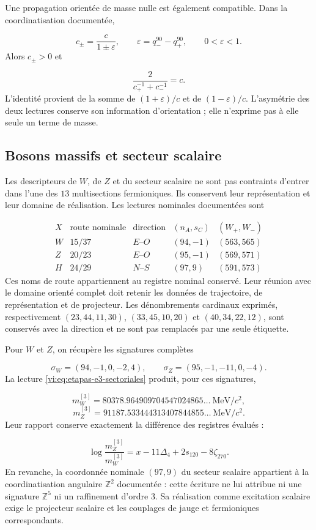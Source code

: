 Une propagation orientée de masse nulle est également compatible. Dans la
coordinatisation documentée,

\[
 c_\pm=\frac{c}{1\pm\varepsilon},\qquad
 \varepsilon=q_-^{90}-q_+^{90},\qquad0<\varepsilon<1.
\]
Alors \(c_\pm>0\) et

\[
 \frac{2}{c_+^{-1}+c_-^{-1}}=c.
\]
L’identité provient de la somme de \((1+\varepsilon)/c\) et de
\((1-\varepsilon)/c\). L’asymétrie des deux lectures conserve son
information d’orientation ; elle n’exprime pas à elle seule un terme de masse.


\subsection{Bosons massifs et secteur scalaire
}
\label{vi:subsec:bosones-familias}

Les descripteurs de \(W\), de \(Z\) et du secteur scalaire ne sont pas contraints
d’entrer dans l’une des \(13\) multisections fermioniques. Ils conservent leur
représentation et leur domaine de réalisation. Les lectures nominales
documentées sont

\[
\begin{array}{c|c|c|c|c}
 X&\text{route nominale}&\text{direction}&(n_A,s_C)&(W_+,W_-)\\\hline
 W&15/37&E\text{--}O&(94,-1)&(563,565)\\
 Z&20/23&E\text{--}O&(95,-1)&(569,571)\\
 H&24/29&N\text{--}S&(97,9)&(591,573)
\end{array}
\]
Ces noms de route appartiennent au registre nominal conservé. Leur
réunion avec le domaine orienté complet doit retenir les données de
trajectoire, de représentation et de projecteur. Les dénombrements cardinaux
exprimés, respectivement \((23,44,11,30)\), \((33,45,10,20)\) et
\((40,34,22,12)\), sont conservés avec la direction et ne sont pas remplacés
par une seule étiquette.


Pour \(W\) et \(Z\), on récupère les signatures complètes

\[
 \sigma_W=(94,-1,0,-2,4),\qquad
 \sigma_Z=(95,-1,-11,0,-4).
\]
La lecture \eqref{vi:eq:etapas-e3-sectoriales} produit, pour ces signatures,

\[
 m_W^{[3]}=80378.964909704547024865\ldots\ \mathrm{MeV}/c^2,
\]
\[
 m_Z^{[3]}=91187.533444313407844855\ldots\ \mathrm{MeV}/c^2.
\]
Leur rapport conserve exactement la différence des registres évalués :

\[
 \log\frac{m_Z^{[3]}}{m_W^{[3]}}
 =x-11\Delta_4+2s_{120}-8\zeta_{270}.
\]
En revanche, la coordonnée nominale \((97,9)\) du secteur scalaire appartient
à la coordinatisation angulaire \(\mathbb Z^2\) documentée : cette écriture ne lui attribue
ni une signature \(\mathbb Z^5\) ni un raffinement d’ordre
\(3\). Sa réalisation comme excitation scalaire exige le projecteur
scalaire et les couplages de jauge et fermioniques correspondants.


